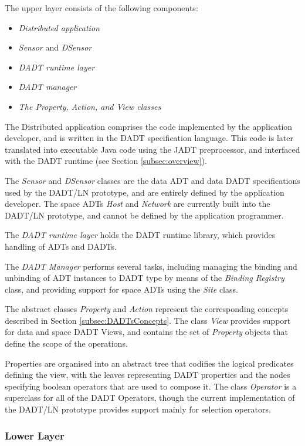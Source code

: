 The upper layer consists of the following components:

\begin{itemize}
\item \emph {Distributed application}
\item \emph{Sensor} and \emph{DSensor}
\item \emph{DADT runtime layer}
\item \emph{DADT manager}
\item \emph{The Property, Action, and View classes}
\end{itemize}

The Distributed application comprises the code implemented by
the application developer, and is written in the DADT specification language. This code is later  translated into executable Java
code using the JADT preprocessor, and interfaced with the DADT runtime (see Section \ref{subsec:overview}).

The \emph{Sensor} and \emph{DSensor} classes are the data ADT and data DADT
specifications used by the DADT/LN prototype, and are entirely defined by the
application developer. The space ADTs \emph{Host} and \emph{Network} are
currently built into the DADT/LN prototype, and cannot be defined by the
application programmer. 

The \emph{DADT runtime layer} holds the DADT runtime library, which provides
handling of ADTs and DADTs. 

The \emph{DADT Manager} performs several tasks, including managing the binding and unbinding
of ADT instances to DADT type by means of the  \emph{Binding Registry} class,
and providing support for space ADTs using the \emph{Site} class. 

The abstract classes \emph{Property} and \emph{Action} represent the
corresponding concepts described in Section \ref{subsec:DADTsConcepts}.
The class \emph{View} provides support for data and space DADT Views, and
contains the set of \emph{Property} objects that define the scope of the
operations. 

Properties are organised into an abstract tree that codifies the
logical predicates defining the view, with the leaves representing DADT
properties and the nodes specifying boolean operators that are used to compose it.
The class \emph{Operator} is a superclass for all of the DADT Operators, though
the current implementation of the DADT/LN prototype provides support mainly for
selection operators.

\subsubsection{Lower Layer} \label{subsubsec:LowerLayer}

